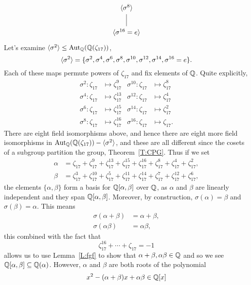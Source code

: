 \documentclass{ximera}
\begin{document}
\begin{example}
\[\begin{tikzcd}
    \<\sigma^8\> \ar[d,-]\\
    \<\sigma^{16}=e\> 
  \end{tikzcd}
  \]
  Let's examine $\langle\sigma^2\rangle\leq \operatorname{Aut}_\mathbb Q(\mathbb Q(\zeta_{17}))$,
  \[
  \langle\sigma^2\rangle = \{ \sigma^2, \sigma^4,\sigma^6,\sigma^8,\sigma^{10},\sigma^{12},\sigma^{14},\sigma^{16} = e\}.
  \]
  Each of these maps permute powers of $\zeta_{17}$ and fix elements
  of $\mathbb Q$. Quite explicitly,
  \begin{align*}
    \sigma^2: \zeta_{17} &\mapsto \zeta_{17}^9    & \sigma^{10}: \zeta_{17} &\mapsto \zeta_{17}^{8}\\
    \sigma^4: \zeta_{17} &\mapsto \zeta_{17}^{13} & \sigma^{12}: \zeta_{17} &\mapsto \zeta_{17}^{4}\\
    \sigma^6: \zeta_{17} &\mapsto \zeta_{17}^{15} & \sigma^{14}: \zeta_{17} &\mapsto \zeta_{17}^{2}\\
    \sigma^8: \zeta_{17} &\mapsto \zeta_{17}^{16} & \sigma^{16}: \zeta_{17} &\mapsto \zeta_{17}.
  \end{align*}
  There are eight field isomorphisms above, and hence there are eight
  more field isomorphisms in $\operatorname{Aut}_\mathbb Q(\mathbb Q(\zeta_{17})) - \langle
  \sigma^2\rangle$, and these are all different since the cosets of a
  subgroup partition the group, Theorem~\ref{T:CPG}. Thus if we set 
  \begin{align*}
    \alpha &= \zeta_{17}   + \zeta_{17}^9 + \zeta_{17}^{13} + \zeta_{17}^{15} + \zeta_{17}^{16} + \zeta_{17}^{8} + \zeta_{17}^{4} + \zeta_{17}^{2},\\
    \beta &= \zeta_{17}^3 + \zeta_{17}^{10} + \zeta_{17}^{5} + \zeta_{17}^{11} + \zeta_{17}^{14} + \zeta_{17}^{7} + \zeta_{17}^{12} + \zeta_{17}^{6},
  \end{align*} 
  the elements $\{\alpha,\beta\}$ form a basis for $\mathbb Q[\alpha,\beta]$
  over $\mathbb Q$, as $\alpha$ and $\beta$ are linearly independent and they
  span $\mathbb Q[\alpha,\beta]$. Moreover, by construction, $\sigma(\alpha)
  = \beta$ and $\sigma(\beta) = \alpha$. This means
  \begin{align*}
    \sigma(\alpha+\beta) &= \alpha + \beta,\\
    \sigma(\alpha\beta) &= \alpha\beta,
  \end{align*}
  this combined with the fact that
  \[
  \zeta_{17}^{16} + \cdots +\zeta_{17} =-1 
  \]
  allows us to use Lemma~\ref{L:fgf} to show that
  $\alpha+\beta,\alpha\beta\in\mathbb Q$ and so we see
  $\mathbb Q[\alpha,\beta]\subseteq \mathbb Q(\alpha)$. However, $\alpha$ and $\beta$
  are both roots of the polynomial
  \[
  x^2 - (\alpha +\beta) x + \alpha\beta\in\mathbb Q[x]
\]
\end{example}
\end{document}
